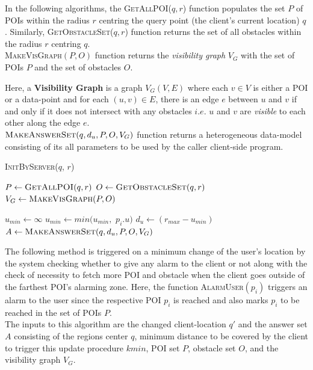\documentclass{sig-alternate}
\begin{document}
In the following algorithms, the \textsc{GetAllPOI}($q, r$) function populates the set $P$ of POIs within the radius $r$ centring the query point (the client's current location) $q$. Similarly, \textsc{GetObstacleSet}($q, r$) function returns the set of all obstacles within the radius $r$ centring $q$.\\

\textsc{MakeVisGraph}$(P,O)$ function returns the \textit{visibility graph} $V_G$ with the set of POIs $P$ and the set of obstacles $O$.

Here, a \textbf{Visibility Graph} is a graph $V_G(V,E)$ where each $v \in V$ is either a POI or a data-point and for each $(u,v) \in E$, there is an edge $e$ between $u$ and $v$ if and only if it does not intersect with any obstacles $i.e.$ $u$ and $v$ are \textit{visible} to each other along the edge $e$.\\

$\textsc{MakeAnswerSet}(q, d_u, P, O, V_G)$ function returns a heterogeneous data-model consisting of its all parameters to be used by the caller client-side program.

\DontPrintSemicolon
\begin{algorithm}
\caption{\textsc{InitByServer}($q$, $r$)}
	
	 $P \gets \textsc{GetAllPOI}(q, r)$ \;
	 $O \gets \textsc{GetObstacleSet}(q, r)$ \;
	 $V_G \gets \textsc{MakeVisGraph}(P, O)$ \;
	 
	 $u_{min} \gets \infty$\;
	 {
		 $u_{min} \gets min( u_{min},$ $p_i.u )$ \; 
	}
	$d_u \gets (r_{max} - u_{min})$ \\
	\Return $A \gets \textsc{MakeAnswerSet}(q, d_u, P, O, V_G)$ \;
\label{InitByServer}
\end{algorithm}

The following method is triggered on a minimum change of the user's location by the system checking whether to give any alarm to the client or not along with the check of necessity to fetch more POI and obstacle when the client goes outside of the farthest POI's alarming zone.
Here, the function \textsc{AlarmUser}$(p_i)$ triggers an alarm to the user since the respective POI $p_i$ is reached and also marks $p_i$ to be reached in the set of POIs $P$. \\
The inputs to this algorithm are the changed client-location $q'$ and the answer set $A$ consisting of the regions center $q$, minimum distance to be covered by the client to trigger this update procedure $k{min}$, POI set $P$, obstacle set $O$, and the visibility graph $V_G$.
 
\end{document}
